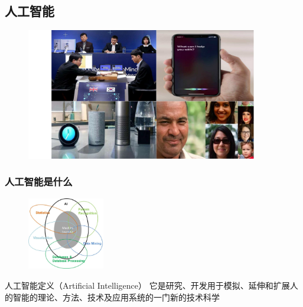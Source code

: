 \documentclass[10pt,aspectratio=43,mathserif,table]{beamer}
\begin{document}
\subsection{人工智能}
\begin{frame}
	\begin{figure}[htbp]
		\centering
		\includegraphics[width=0.9\textwidth]{figures/ai.jpg}
	\end{figure}
\end{frame}
\begin{frame}
	\frametitle{人工智能是什么}
	\begin{figure}[htbp]
		\centering
		\includegraphics[width=0.3\textwidth]{figures/whatisai.jpg}
	\end{figure}
	\begin{block}{人工智能定义（Artificial Intelligence）}
		它是研究、开发用于模拟、延伸和扩展人的智能的理论、方法、技术及应用系统的一门新的技术科学
	\end{block}
\end{frame}
\end{document}
